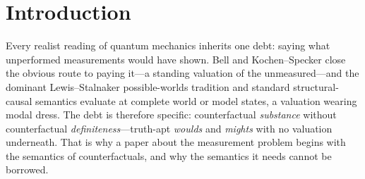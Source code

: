\documentclass[11pt]{article}
\theoremstyle{definition}
\begin{document}
\begin{abstract}
\end{abstract}

\section{Introduction}\label{sec:intro}

Every realist reading of quantum mechanics inherits one debt: saying what unperformed measurements would have shown. Bell and Kochen--Specker close the obvious route to paying it---a standing valuation of the unmeasured---and the dominant Lewis--Stalnaker possible-worlds tradition and standard structural-causal semantics evaluate at complete world or model states, a valuation wearing modal dress. The debt is therefore specific: counterfactual \emph{substance} without counterfactual \emph{definiteness}---truth-apt \emph{woulds} and \emph{mights} with no valuation underneath. That is why a paper about the measurement problem begins with the semantics of counterfactuals, and why the semantics it needs cannot be borrowed.
\end{document}
